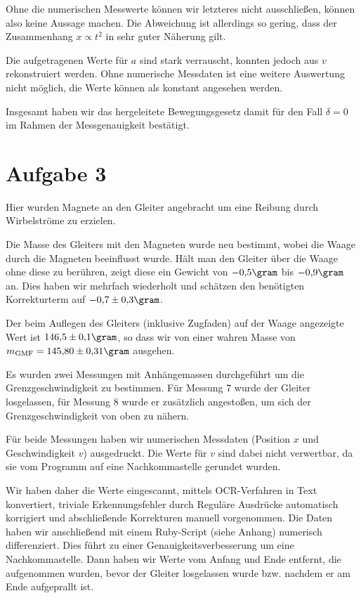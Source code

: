 \documentclass[a4paper,german,12pt,smallheadings]{scrartcl}
\begin{document}
Ohne die numerischen Messwerte können wir letzteres nicht ausschließen, können
also keine Aussage machen. Die Abweichung ist allerdings so gering, dass der
Zusammenhang $x \propto t^2$ in sehr guter Näherung gilt.

Die aufgetragenen Werte für $a$ sind stark verrauscht, konnten jedoch aus $v$
rekonstruiert werden. Ohne numerische Messdaten ist eine weitere Auswertung
nicht möglich, die Werte können als konstant angesehen werden.

Insgesamt haben wir das hergeleitete Bewegungsgesetz damit für den Fall $\delta
= 0$ im Rahmen der Messgenauigkeit bestätigt.

\section*{Aufgabe 3}


Hier wurden Magnete an den Gleiter angebracht um eine Reibung durch
Wirbelströme zu erzielen.

Die Masse des Gleiters mit den Magneten wurde neu bestimmt, wobei die Waage
durch die Magneten beeinflusst wurde. Hält man den Gleiter über die Waage ohne
diese zu berühren, zeigt diese ein Gewicht von $-0{,}5 \gram$ bis $-0{,}9
\gram$  an. Dies haben wir mehrfach wiederholt und schätzen den benötigten
Korrekturterm auf $-0{,}7 \pm 0{,}3 \gram$.

Der beim Auflegen des Gleiters (inklusive Zugfaden) auf der Waage angezeigte
Wert ist $146{,}5\pm0{,}1 \gram$, so dass wir von einer wahren Masse von
$m_\text{GMF} = 145{,}80\pm0{,}31 \gram$ ausgehen.


Es wurden zwei Messungen mit Anhängemassen durchgeführt um die
Grenzgeschwindigkeit zu bestimmen. Für Messung 7 wurde der Gleiter losgelassen,
für Messung 8 wurde er zusätzlich angestoßen, um sich der Grenzgeschwindigkeit
von oben zu nähern.

Für beide Messungen haben wir numerischen Messdaten (Position $x$ und
Geschwindigkeit $v$) ausgedruckt. Die Werte für $v$ sind dabei nicht
verwertbar, da sie vom Programm auf eine Nachkommastelle gerundet wurden.

Wir haben daher die Werte eingescannt, mittels OCR-Verfahren in Text konvertiert,
triviale Erkennungsfehler durch Reguläre Ausdrücke automatisch korrigiert und
abschließende Korrekturen manuell vorgenommen. Die Daten haben wir anschließend
mit einem Ruby-Script (siehe Anhang) numerisch differenziert. Dies führt zu
einer Genauigkeitsverbesserung um eine Nachkommastelle. Dann haben wir Werte
vom Anfang und Ende entfernt, die aufgenommen wurden, bevor der Gleiter
losgelassen wurde bzw. nachdem er am Ende aufgeprallt ist.
\end{document}
